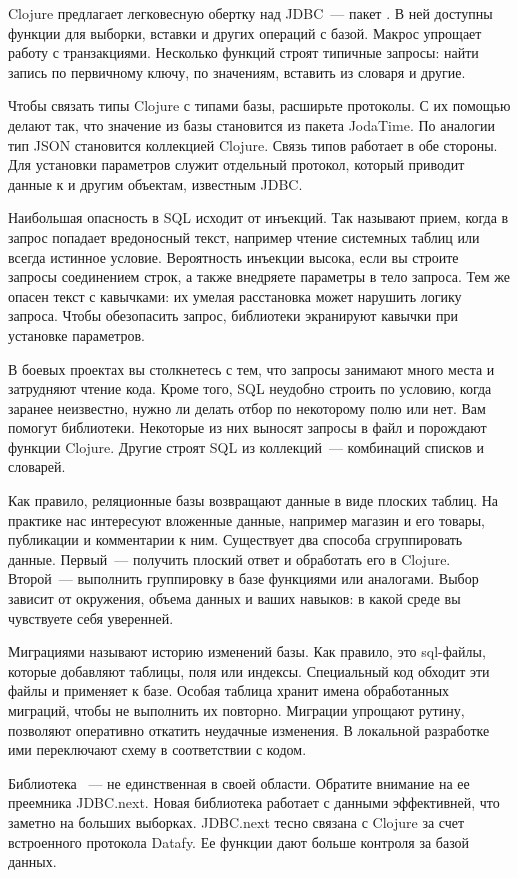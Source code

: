 Clojure предлагает легковесную обертку над JDBC~--- пакет . В ней доступны функции для выборки, вставки и других операций с базой. Макрос  упрощает работу с транзакциями. Несколько функций строят типичные запросы: найти запись по первичному ключу, по значениям, вставить из словаря и другие.

Чтобы связать типы Clojure с типами базы, расширьте протоколы. С их помощью делают так, что значение  из базы становится  из пакета JodaTime. По аналогии тип JSON становится коллекцией Clojure. Связь типов работает в обе стороны. Для установки параметров служит отдельный протокол, который приводит данные к  и другим объектам, известным JDBC.

Наибольшая опасность в SQL исходит от инъекций. Так называют прием, когда в запрос попадает вредоносный текст, например чтение системных таблиц или всегда истинное условие. Вероятность инъекции высока, если вы строите запросы соединением строк, а также внедряете параметры в тело запроса. Тем же опасен текст с кавычками: их умелая расстановка может нарушить логику запроса. Чтобы обезопасить запрос, библиотеки экранируют кавычки при установке параметров.

В боевых проектах вы столкнетесь с тем, что запросы занимают много места и затрудняют чтение кода. Кроме того, SQL неудобно строить по условию, когда заранее неизвестно, нужно ли делать отбор по некоторому полю или нет. Вам помогут библиотеки. Некоторые из них выносят запросы в файл и порождают функции Clojure. Другие строят SQL из коллекций~--- комбинаций списков и словарей.

Как правило, реляционные базы возвращают данные в виде плоских таблиц. На практике нас интересуют вложенные данные, например магазин и его товары, публикации и комментарии к ним. Существует два способа сгруппировать данные. Первый~--- получить плоский ответ и обработать его в Clojure. Второй~--- выполнить группировку в базе функциями  или аналогами. Выбор зависит от окружения, объема данных и ваших навыков: в какой среде вы чувствуете себя уверенней.

Миграциями называют историю изменений базы. Как правило, это sql-файлы, которые добавляют таблицы, поля или индексы. Специальный код обходит эти файлы и применяет к базе. Особая таблица хранит имена обработанных миграций, чтобы не выполнить их повторно. Миграции упрощают рутину, позволяют оперативно откатить неудачные изменения. В локальной разработке ими переключают схему в соответствии с кодом.

Библиотека ~--- не единственная в своей области. Обратите внимание на ее преемника JDBC.next. Новая библиотека работает с данными эффективней, что заметно на больших выборках. JDBC.next тесно связана с Clojure за счет встроенного протокола Datafy. Ее функции дают больше контроля за базой данных.

